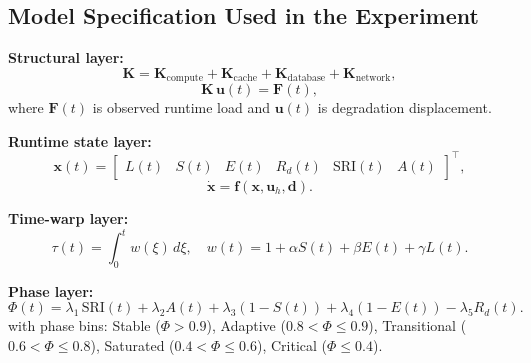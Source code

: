 \documentclass[conference]{IEEEtran}
\begin{document}
\subsection{Model Specification Used in the Experiment}
\textbf{Structural layer:}
\begin{equation}
\mathbf{K}=\mathbf{K}_{\mathrm{compute}}+\mathbf{K}_{\mathrm{cache}}+\mathbf{K}_{\mathrm{database}}+\mathbf{K}_{\mathrm{network}},
\label{eq:K}
\end{equation}
\begin{equation}
\mathbf{K}\,\mathbf{u}(t)=\mathbf{F}(t),
\label{eq:equilibrium}
\end{equation}
where $\mathbf{F}(t)$ is observed runtime load and $\mathbf{u}(t)$ is degradation displacement.

\textbf{Runtime state layer:}
\begin{equation}
\mathbf{x}(t)=
\begin{bmatrix}
L(t) & S(t) & E(t) & R_d(t) & \mathrm{SRI}(t) & A(t)
\end{bmatrix}^{\top},
\label{eq:state}
\end{equation}
\begin{equation}
\dot{\mathbf{x}}=\mathbf{f}(\mathbf{x},\mathbf{u}_h,\mathbf{d}).
\label{eq:dynamics}
\end{equation}

\textbf{Time-warp layer:}
\begin{equation}
\tau(t)=\int_0^t w(\xi)\,d\xi, \quad
w(t)=1+\alpha S(t)+\beta E(t)+\gamma L(t).
\label{eq:warp}
\end{equation}

\textbf{Phase layer:}
\begin{equation}
\Phi(t)=\lambda_1\,\mathrm{SRI}(t)+\lambda_2 A(t)+\lambda_3(1-S(t))
+\lambda_4(1-E(t)) - \lambda_5 R_d(t).
\label{eq:phi}
\end{equation}
with phase bins: Stable ($\Phi>0.9$), Adaptive ($0.8<\Phi\le0.9$), Transitional ($0.6<\Phi\le0.8$), Saturated ($0.4<\Phi\le0.6$), Critical ($\Phi\le0.4$).
\end{document}

